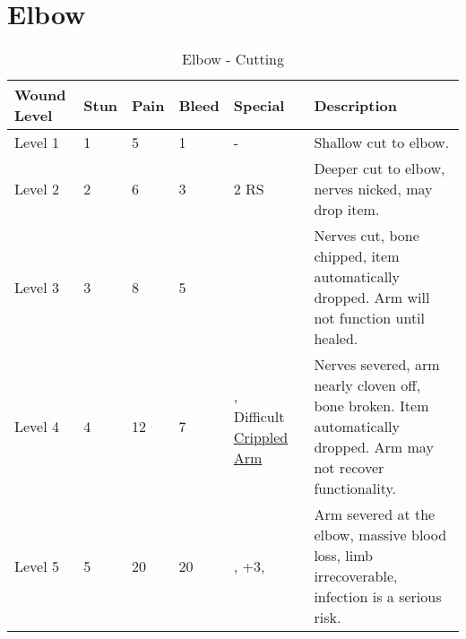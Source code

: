 \documentclass[oneside,11pt,english]{book}
\begin{document}
\section{Elbow} \vspace{-25pt} \label{sec:elbow}
\begin{table}[!hb] %
	\caption{Elbow - Cutting}
	\label{wound:Elbow - Cutting}
	\begin{tabu} to 
Wound Level &Stun &Pain &Bleed &Special &Description\\\toprule
Level 1& 1& 5& 1& - &Shallow cut to elbow.\\
Level 2& 2& 6& 3&  2 RS &Deeper cut to elbow, nerves nicked, may drop item.\\
Level 3& 3& 8& 5&  &Nerves cut, bone chipped, item automatically dropped. Arm will not function until healed.\\
Level 4& 4& 12& 7& , \newline
	Difficult~ \hyperref[bane:Crippled Limb/Appendage]{Crippled Arm} &Nerves severed, arm nearly cloven off, bone broken. Item automatically dropped. Arm may not recover functionality.\\
Level 5& 5& 20& 20& , \newline
	 +3, \newline
	 &Arm severed at the elbow, massive blood loss, limb irrecoverable, infection is a serious risk.\\
		\end{tabu}
\end{table}
\end{document}
